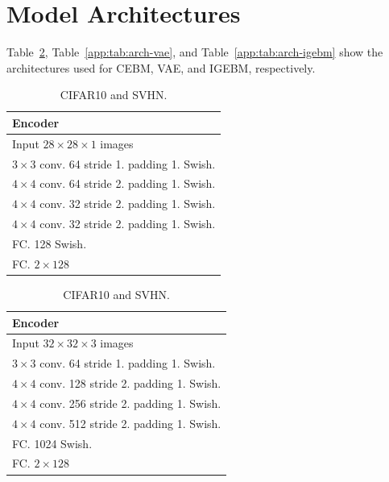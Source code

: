 \newpage
\section{Model Architectures}
\label{appendix-architectures}
Table~\ref{app:tab:arch-cebm}, Table~\ref{app:tab:arch-vae}, and Table~\ref{app:tab:arch-igebm} show the architectures used for CEBM, VAE, and IGEBM, respectively.

\begin{table}[!h]
\caption{Architecture of CEBM and GMM-CEBM}
    \centering
    \vspace*{1ex}
    \begin{subtable}[h]{.5\linewidth}
    \caption{MNIST and Fashion-MNIST.}
    \centering
        \begin{tabular}{|l|}
        \toprule
        \textbf{Encoder} \\
        \midrule
        Input $28\times28\times1$ images  \\
        \hline 
        $3\times3$ conv. 64 stride 1. padding 1. Swish.  \\
        \hline 
        $4\times4$ conv. 64 stride 2. padding 1. Swish. \\
        \hline 
        $4\times4$ conv. 32 stride 2. padding 1. Swish.  \\
        \hline
        $4\times4$ conv. 32 stride 2. padding 1. Swish. \\
        \hline
        FC. 128 Swish. \\
        \hline
        FC. $2\times128$ \\
        \bottomrule
        \end{tabular}
    \end{subtable}%
    \begin{subtable}[h]{.5\textwidth}
    \caption{CIFAR10 and SVHN.}
    \centering
        \begin{tabular}{|l|}
        \toprule
        \textbf{Encoder}  \\
        \midrule
        Input $32\times32\times3$ images  \\
        \hline 
        $3\times3$ conv. 64 \hspace{0.2em} stride 1. padding 1. Swish.  \\
        \hline 
        $4\times4$ conv. 128 stride 2. padding 1. Swish. \\
        \hline 
        $4\times4$ conv. 256  stride 2. padding 1. Swish.  \\
        \hline
        $4\times4$ conv. 512  stride 2. padding 1. Swish.  \\
        \hline
        FC. 1024 Swish. \\
        \hline
        FC. $2\times128$\\
        \bottomrule
        \end{tabular}
    \vspace*{1ex}
    \end{subtable}
    \label{app:tab:arch-cebm}
\end{table}

